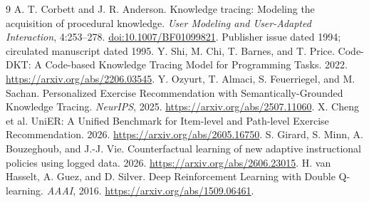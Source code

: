 \documentclass[11pt,a4paper]{article}
\begin{document}
\begin{thebibliography}{9}
 A. T. Corbett and J. R. Anderson. Knowledge tracing: Modeling the acquisition of procedural knowledge. \emph{User Modeling and User-Adapted Interaction}, 4:253--278. \href{https://doi.org/10.1007/BF01099821}{doi:10.1007/BF01099821}. Publisher issue dated 1994; circulated manuscript dated 1995.
 Y. Shi, M. Chi, T. Barnes, and T. Price. Code-DKT: A Code-based Knowledge Tracing Model for Programming Tasks. 2022. \url{https://arxiv.org/abs/2206.03545}.
 Y. Ozyurt, T. Almaci, S. Feuerriegel, and M. Sachan. Personalized Exercise Recommendation with Semantically-Grounded Knowledge Tracing. \emph{NeurIPS}, 2025. \url{https://arxiv.org/abs/2507.11060}.
 X. Cheng et al. UniER: A Unified Benchmark for Item-level and Path-level Exercise Recommendation. 2026. \url{https://arxiv.org/abs/2605.16750}.
 S. Girard, S. Minn, A. Bouzeghoub, and J.-J. Vie. Counterfactual learning of new adaptive instructional policies using logged data. 2026. \url{https://arxiv.org/abs/2606.23015}.
 H. van Hasselt, A. Guez, and D. Silver. Deep Reinforcement Learning with Double Q-learning. \emph{AAAI}, 2016. \url{https://arxiv.org/abs/1509.06461}.
\end{thebibliography}
\end{document}
